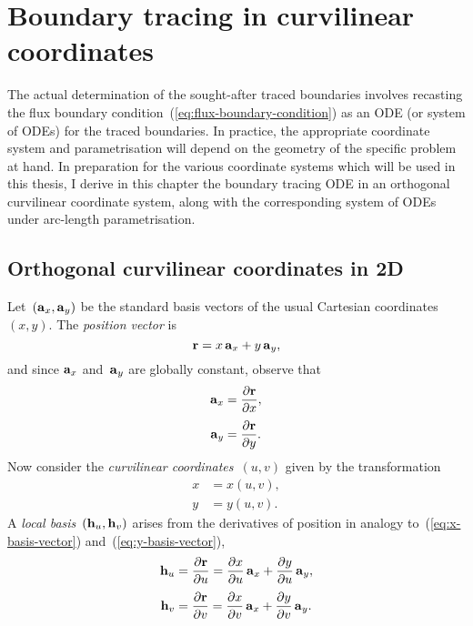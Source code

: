 \chapter{Boundary tracing in curvilinear coordinates}

The actual determination of the sought-after traced boundaries involves
recasting the flux boundary condition~(\ref{eq:flux-boundary-condition})
as an ODE (or system of ODEs) for the traced boundaries.
In practice, the appropriate coordinate system and parametrisation
will depend on the geometry of the specific problem at hand.
In preparation for the various coordinate systems
which will be used in this thesis,
I derive in this chapter the boundary tracing ODE
in an orthogonal curvilinear coordinate system,
along with the corresponding system of ODEs
under arc-length parametrisation.

\section{Orthogonal curvilinear coordinates in 2D}

Let~$(\mathop{}\!\boldsymbol{\mathrm{a}}_{x}, \mathop{}\!\boldsymbol{\mathrm{a}}_{y})$ be the standard basis vectors
of the usual Cartesian coordinates~$(x, y)$.
The \emph{position vector} is
\begin{equation}
  \boldsymbol{\mathrm{r}} = x \mathop{}\!\boldsymbol{\mathrm{a}}_{x} + y \mathop{}\!\boldsymbol{\mathrm{a}}_{y},
  \label{eq:position-vector-cartesian}
\end{equation}
and since $\mathop{}\!\boldsymbol{\mathrm{a}}_{x}$ and~$\mathop{}\!\boldsymbol{\mathrm{a}}_{y}$ are globally constant,
observe that
\begin{align}
  \orthonvec{x} &= \pder{\vec{r}}{x},
    \label{eq:x-basis-vector} \\[\fraclinespace]
  \orthonvec{y} &= \pder{\vec{r}}{y}.
    \label{eq:y-basis-vector}
\end{align}
Now consider the \emph{curvilinear coordinates}~$(u, v)$
given by the transformation
\begin{align}
  x &= x (u, v), \label{eq:curvilinear-x-transformation} \\
  y &= y (u, v). \label{eq:curvilinear-y-transformation}
\end{align}
A \emph{local basis}~$(\mathop{}\!\boldsymbol{\mathrm{h}}_{u}, \mathop{}\!\boldsymbol{\mathrm{h}}_{v})$
arises from the derivatives of position
in analogy to~(\ref{eq:x-basis-vector}) and~(\ref{eq:y-basis-vector}),
\begin{align}
  \orthogvec{u} &
    = \pder{\vec{r}}{u}
    = \pder{x}{u} \orthonvec{x} + \pder{y}{u} \orthonvec{y},
      \label{eq:u-local-basis-vector} \\[\fraclinespace]
  \orthogvec{v} &
    = \pder{\vec{r}}{v}
    = \pder{x}{v} \orthonvec{x} + \pder{y}{v} \orthonvec{y}.
      \label{eq:v-local-basis-vector}
\end{align}


